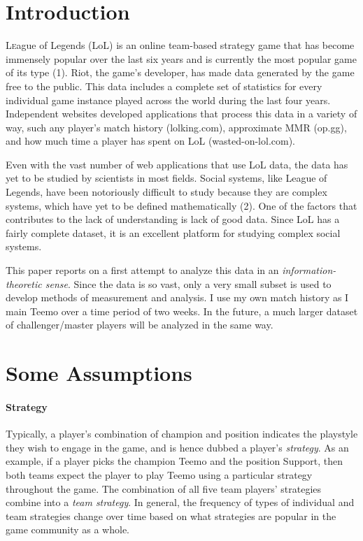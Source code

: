 \documentclass[twoside]{article}
\begin{document}
\begin{multicols}{2} %

\section{Introduction}

\lettrine[nindent=0em,lines=3]{L}eague of Legends (LoL) is an online team-based strategy game that has become immensely popular over the last six years and is currently the most popular game of its type (1). Riot, the game's developer, has made data generated by the game free to the public. This data includes a complete set of statistics for every individual game instance played across the world during the last four years. Independent websites developed applications that process this data in a variety of way, such any player's match history (lolking.com), approximate MMR (op.gg), and how much time a player has spent on LoL (wasted-on-lol.com).

Even with the vast number of web applications that use LoL data, the data has yet to be studied by scientists in most fields. Social systems, like League of Legends, have been notoriously difficult to study because they are complex systems, which have yet to be defined mathematically (2). One of the factors that contributes to the lack of understanding is lack of good data. Since LoL has a fairly complete dataset, it is an excellent platform for studying complex social systems.

This paper reports on a first attempt to analyze this data in an \textit{information-theoretic sense}. Since the data is so vast, only a very small subset is used to develop methods of measurement and analysis. I use my own match history as I main Teemo over a time period of two weeks. In the future, a much larger dataset of challenger/master players will be analyzed in the same way. 



\section{Some Assumptions}

\paragraph{Strategy} Typically, a player's combination of champion and position indicates the playstyle they wish to engage in the game, and is hence dubbed a player's \textit{strategy}. As an example, if a player picks the champion Teemo and the position Support, then both teams expect the player to play Teemo using a particular strategy throughout the game. The combination of all five team players' strategies combine into a \textit{team strategy}. In general, the frequency of types of individual and team strategies change over time based on what strategies are popular in the game community as a whole.


\end{multicols}
\end{document}
